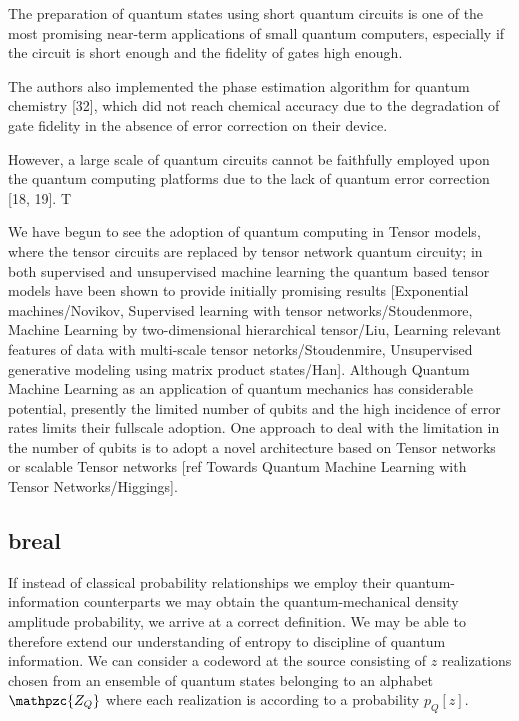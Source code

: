\documentclass[7pt]{article}
\begin{document}
The preparation of quantum states using short quantum circuits is one of the most promising near-term applications of small quantum computers, especially if the circuit is short enough and the fidelity of gates high enough.

The authors also implemented the phase estimation algorithm for quantum chemistry [32], which did not reach chemical accuracy due to the degradation of gate fidelity in the absence of error correction on their device.

However, a large scale of
quantum circuits cannot be faithfully employed upon the quantum computing platforms due to the lack of quantum
error correction [18, 19]. T

We have begun to see the adoption of quantum computing in Tensor models, where the tensor circuits are replaced by tensor network quantum circuity; in both supervised and unsupervised machine learning the quantum based tensor models have been shown to provide initially promising results [Exponential machines/Novikov, Supervised learning with tensor networks/Stoudenmore, Machine Learning by two-dimensional hierarchical tensor/Liu, Learning relevant features of data with multi-scale tensor netorks/Stoudenmire, Unsupervised generative modeling using matrix product states/Han]. Although Quantum Machine Learning as an application of quantum mechanics  has considerable potential, presently the limited number of qubits and the high incidence of error rates limits their fullscale adoption. One approach to deal with the limitation in the number of qubits is to adopt a novel architecture based on Tensor networks or scalable Tensor networks [ref Towards Quantum Machine Learning with Tensor Networks/Higgings].


\subsection{breal}
If instead of classical probability relationships we employ their quantum-information counterparts we may obtain the quantum-mechanical density amplitude probability, we arrive at a correct definition. We may be able to therefore extend our understanding of entropy to discipline of quantum information. We can consider a codeword at the source consisting of $z$ realizations chosen from an ensemble of quantum states belonging to an alphabet $\mathpzc{Z_Q}$ where each realization is according to a probability $p_Q[z]$.




\end{document}
